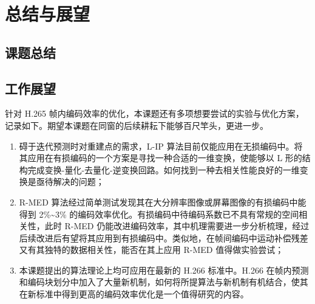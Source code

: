 \chapter{总结与展望}
\label{cha:c5}

\section{课题总结}

\section{工作展望}
针对 H.265 帧内编码效率的优化，本课题还有多项想要尝试的实验与优化方案，记录如下。期望本课题在同窗的后续耕耘下能够百尺竿头，更进一步。
\begin{enumerate}
    \item 碍于迭代预测时对重建点的需求，L-IP 算法目前仅能应用在无损编码中。将其应用在有损编码的一个方案是寻找一种合适的一维变换，使能够以 L 形的结构完成变换-量化-去量化-逆变换回路。如何找到一种去相关性能良好的一维变换是亟待解决的问题；
    \item R-MED 算法经过简单测试发现其在大分辨率图像或屏幕图像的有损编码中能得到 2\%\textasciitilde 3\% 的编码效率优化。有损编码中待编码系数已不具有常规的空间相关性，此时 R-MED 仍能改进编码效率，其中机理需要进一步分析梳理，经过后续改进后有望将其应用到有损编码中。类似地，在帧间编码中运动补偿残差又有其独特的数据相关性，能否在其上应用 R-MED 值得做实验尝试；
    \item 本课题提出的算法理论上均可应用在最新的 H.266 标准中。H.266 在帧内预测和编码块划分中加入了大量新机制，如何将所提算法与新机制有机结合，使其在新标准中得到更高的编码效率优化是一个值得研究的内容。
\end{enumerate}